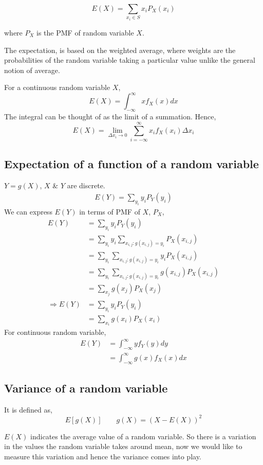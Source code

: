 \documentclass{article}
\begin{document}
$$ E(X)= \sum_{x_i \in S}x_i P_X(x_i)$$

where $P_X$ is the PMF of random variable $X$.

The expectation, is based on the weighted average, where weights are the probabilities of the random variable taking a particular value unlike the general notion of average.

For a continuous random variable $X$,
$$ E(X)= \int_{-\infty}^{\infty}x f_X(x)dx$$
The integral can be thought of as the limit of a summation. Hence,
$$ E(X)= \lim_{\Delta x_i \to 0} \sum_{i= -\infty}^{\infty}x_i f_X(x_i) \Delta x_i$$

\subsection{Expectation of a function of a random variable}

$ Y= g(X)$, $X$ \& $Y$ are discrete.
\begin{align*}
    E(Y)= \sum_{y_i}y_i P_Y(y_i)
\end{align*}
We can express $E(Y)$ in terms of PMF of $X$, $P_X$,
\begin{align*}
    E(Y)&= \sum_{y_i}y_i P_Y(y_i) \\
    &= \sum_{y_i}y_i \sum_{x_{i,j}:g(x_{i,j})= y_i} P_X(x_{i,j}) \\
    &= \sum_{y_i} \sum_{x_{i,j}:g(x_{i,j})= y_i} y_i P_X(x_{i,j}) \\
    &= \sum_{y_i} \sum_{x_{i,j}:g(x_{i,j})= y_i} g(x_{i,j}) P_X(x_{i,j}) \\
    &= \sum_{x_j} g(x_j) P_X(x_j)\\
    \Rightarrow E(Y) &= \sum_{y_i}y_i P_Y(y_i) \\
    &= \sum_{x_i} g(x_i) P_X(x_i)
\end{align*}
For continuous random variable,
\begin{align*}
    E(Y) &= \int_{-\infty}^{\infty}y f_Y(y)dy \\
    &= \int_{-\infty}^{\infty} g(x)f_X(x)dx
\end{align*}

\subsection{Variance of a random variable}
It is defined as,
$$ E[g(X)] \qquad g(X)= (X - E(X))^2$$

$E(X)$ indicates the average value of a random variable. So there is a variation in the values the random variable takes around mean, now we would like to measure this variation and hence the variance comes into play.
\end{document}
